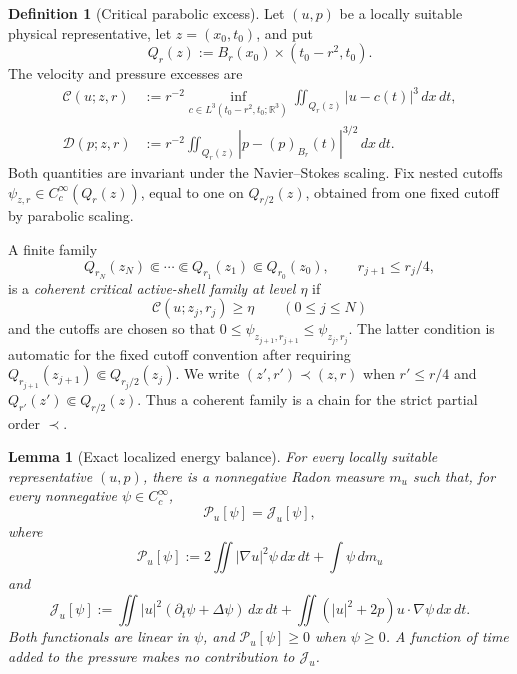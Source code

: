 \documentclass[11pt]{amsart}
\numberwithin{equation}{section}
\theoremstyle{plain}
\newtheorem{lemma}[lemma]{Lemma}
\theoremstyle{definition}
\newtheorem{definition}[definition]{Definition}
\theoremstyle{remark}
\begin{document}
\begin{definition}[Critical parabolic excess]
\label{def:critical-parabolic-excess}
Let \((u,p)\) be a locally suitable physical representative, let
\(z=(x_0,t_0)\), and put
\[
 Q_r(z):=B_r(x_0)\times(t_0-r^2,t_0).
\]
The velocity and pressure excesses are
\begin{align}
 \mathscr C(u;z,r)
 &:=r^{-2}\inf_{c\in L^3(t_0-r^2,t_0;\mathbb R^3)}
       \iint_{Q_r(z)}|u-c(t)|^3\,dx\,dt,
 \label{eq:critical-velocity-excess}\\
 \mathscr D(p;z,r)
 &:=r^{-2}\iint_{Q_r(z)}
       |p-(p)_{B_r}(t)|^{3/2}\,dx\,dt.
 \label{eq:critical-pressure-excess}
\end{align}
Both quantities are invariant under the Navier--Stokes scaling.  Fix nested
cutoffs \(\psi_{z,r}\in C_c^\infty(Q_r(z))\), equal to one on
\(Q_{r/2}(z)\), obtained from one fixed cutoff by parabolic scaling.

A finite family
\begin{equation}\label{eq:coherent-critical-shell-family}
 Q_{r_N}(z_N)\Subset\cdots\Subset Q_{r_1}(z_1)
 \Subset Q_{r_0}(z_0),
 \qquad r_{j+1}\le r_j/4,
\end{equation}
is a \emph{coherent critical active-shell family at level \(\eta\)} if
\begin{equation}\label{eq:critical-shell-activity-floor}
 \mathscr C(u;z_j,r_j)\ge\eta
 \qquad(0\le j\le N)
\end{equation}
and the cutoffs are chosen so that
\(0\le\psi_{z_{j+1},r_{j+1}}\le\psi_{z_j,r_j}\).
The latter condition is automatic for the fixed cutoff convention after
requiring
\(Q_{r_{j+1}}(z_{j+1})\Subset Q_{r_j/2}(z_j)\).
We write \((z',r')\prec(z,r)\) when \(r'\le r/4\) and
\(Q_{r'}(z')\Subset Q_{r/2}(z)\).  Thus a coherent family is a chain for
the strict partial order \(\prec\).
\end{definition}

\begin{lemma}[Exact localized energy balance]
\label{lem:exact-localized-energy-balance}
For every locally suitable representative \((u,p)\), there is a nonnegative
Radon measure \(m_u\) such that, for every nonnegative
\(\psi\in C_c^\infty\),
\begin{equation}\label{eq:exact-localized-energy-balance}
 \mathscr P_u[\psi]=\mathscr J_u[\psi],
\end{equation}
where
\begin{equation}\label{eq:localized-production-functional}
 \mathscr P_u[\psi]
 :=2\iint |\nabla u|^2\psi\,dx\,dt+\int\psi\,dm_u
\end{equation}
and
\begin{equation}\label{eq:localized-current-functional}
 \mathscr J_u[\psi]
 :=\iint |u|^2(\partial_t\psi+\Delta\psi)\,dx\,dt
   +\iint (|u|^2+2p)u\cdot\nabla\psi\,dx\,dt .
\end{equation}
Both functionals are linear in \(\psi\), and
\(\mathscr P_u[\psi]\ge0\) when \(\psi\ge0\).  A function of time added to
the pressure makes no contribution to \(\mathscr J_u\).
\end{lemma}
\end{document}
